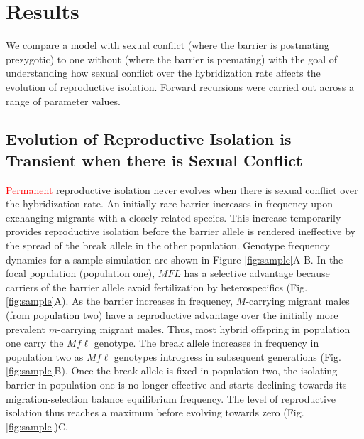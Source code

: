 \documentclass[11pt]{article}
\begin{document}
\section*{Results}

We compare a model with sexual conflict (where the barrier is postmating prezygotic) to one without (where the barrier is premating) with the goal of understanding how sexual conflict over the hybridization rate affects the evolution of reproductive isolation. Forward recursions were carried out across a range of parameter values. 

\subsection*{Evolution of Reproductive Isolation is Transient when there is Sexual Conflict}

\textcolor{red}{Permanent} reproductive isolation never evolves when there is sexual conflict over the hybridization rate. An initially rare barrier increases in frequency upon exchanging migrants with a closely related species.  This increase temporarily provides reproductive isolation before the barrier allele is rendered ineffective by the spread of the break allele in the other population. Genotype frequency dynamics for a sample simulation are shown in Figure \ref{fig:sample}A-B. In the focal population (population one), $MFL$ has a selective advantage because carriers of the barrier allele avoid fertilization by heterospecifics (Fig. \ref{fig:sample}A).  As the barrier increases in frequency, $M$-carrying migrant males (from population two) have a reproductive advantage over the initially more prevalent $m$-carrying migrant males. Thus, most hybrid offspring in population one carry the $Mf\ell$ genotype.  The break allele increases in frequency in population two as $Mf\ell$ genotypes introgress in subsequent generations (Fig. \ref{fig:sample}B). Once the break allele is fixed in population two, the isolating barrier in population one is no longer effective and starts declining towards its migration-selection balance equilibrium frequency.  The level of reproductive isolation thus reaches a maximum before evolving towards zero (Fig. \ref{fig:sample})C.  
\end{document}
